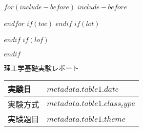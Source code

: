 \documentclass[$if(fontsize)$$fontsize$,$endif$$if(lang)$$babel-lang$,$endif$$if(papersize)$$papersize$,$endif$$for(classoption)$$classoption$$sep$,$endfor$]{$documentclass$}
\begin{document}

$for(include-before)$
$include-before$

$endfor$
$if(toc)$
{
\hypersetup{linkcolor=$if(toccolor)$$toccolor$$else$black$endif$}
\setcounter{tocdepth}{$toc-depth$}
\tableofcontents
}
$endif$
$if(lot)$
\listoftables
$endif$
$if(lof)$
\listoffigures
$endif$



\newenvironment{boldtabular}{ \arrayrulewidth = 2pt }{}
\newenvironment{narrowtabular}{ \renewcommand{\arraystretch}{0.8} }{}
\newenvironment{titletabular}{ \renewcommand{\arraystretch}{1.1} }{}
\newenvironment{datetabular}{ \renewcommand{\arraystretch}{1.1} }{}
\newenvironment{templaturetabular}{ \renewcommand{\arraystretch}{1.18} }{}
\newenvironment{kotitle}{
\centering
  \fontsize{20pt}{20pt}\selectfont
}{}
\fontsize{11pt}{22pt}\selectfont

\vspace*{-13pt}
\begin{kotitle}
  理工学基礎実験レポート

\end{kotitle}

\vspace{19mm}

\begin{titletabular}
\begin{tabularx}{\textwidth}{|m{23mm}|X|}\hline
\parbox[c][9mm][c]{0pt}{}実験日 & $metadata.table1.date$ \\ \hline
\parbox[c][9mm][c]{0pt}{}実験方式  & $metadata.table1.class_type$ \\ \hline
\parbox[c][14mm][c]{0pt}{}実験題目  & $metadata.table1.theme$ \\ \hline
\end{tabularx}
\end{titletabular}

\vspace{8mm}

\end{document}

